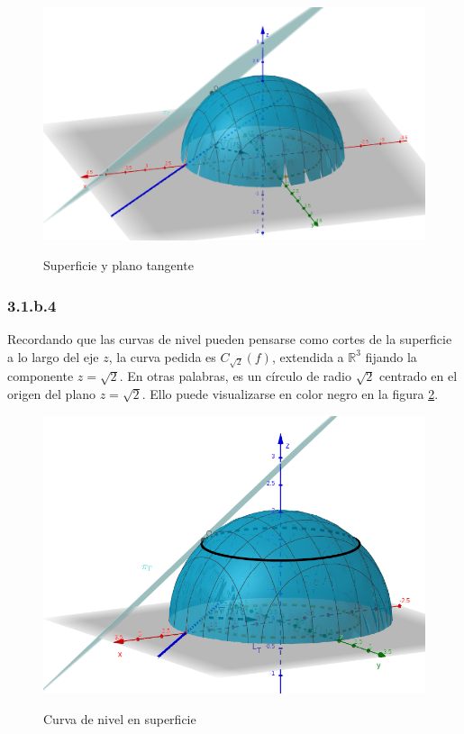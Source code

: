 \documentclass{article}
\renewcommand{\Bbb}{\mathbb}
\begin{document}
\begin{figure}[ht]
\caption{Superficie y plano tangente}
\includegraphics[scale=0.35]{img/ejercicios/3/1-b-3.png} 
\centering
\label{fig:1-b-3}
\end{figure}

\subsubsection*{3.1.b.4}
\label{subsubsec:3.1.b.4}

Recordando que las curvas de nivel pueden pensarse como cortes de la superficie a lo largo del eje $z$, la curva pedida es $C_{\sqrt{2}}(f)$, extendida a $\Bbb R^3$ fijando la componente $z = \sqrt{2}$. En otras palabras, es un círculo de radio $\sqrt{2}$ centrado en el origen del plano $z = \sqrt{2}$. Ello puede visualizarse en color negro en la figura \ref{fig:1-b-4}.

\begin{figure}[ht]
\caption{Curva de nivel en superficie}
\includegraphics[scale=0.35]{img/ejercicios/3/1-b-4.png} 
\centering
\label{fig:1-b-4}
\end{figure}
\end{document}
